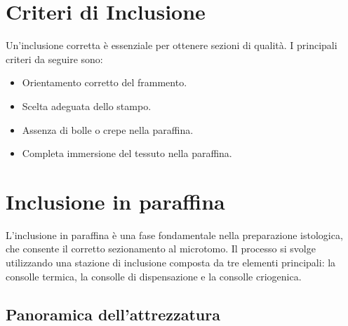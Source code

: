 \section{Criteri di Inclusione}

Un'inclusione corretta è essenziale per ottenere sezioni di qualità. I principali criteri da seguire sono:

\begin{itemize}
    \item Orientamento corretto del frammento.
    \item Scelta adeguata dello stampo.
    \item Assenza di bolle o crepe nella paraffina.
    \item Completa immersione del tessuto nella paraffina.
\end{itemize}



\section{Inclusione in paraffina}

L'inclusione in paraffina è una fase fondamentale nella preparazione istologica, che consente il corretto sezionamento al microtomo. Il processo si svolge utilizzando una stazione di inclusione composta da tre elementi principali: la consolle termica, la consolle di dispensazione e la consolle criogenica.

\subsection{Panoramica dell'attrezzatura}

